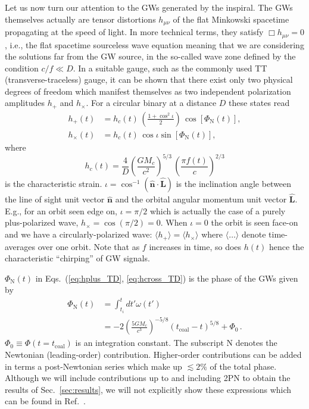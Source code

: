 \documentclass[amsmath,amssymb,aps,floats,amsfonts,notitlepage,superscriptaddress,eqsecnum,nofootinbib,10pt]{revtex4-1}
\newcommand{\nn}{\nonumber}
\newcommand{\f}{\frac}
\newcommand{\be}{\begin{equation}}
\newcommand{\ee}{\end{equation}}
\begin{document}
Let us now turn our attention to the GWs generated by the inspiral.
The GWs themselves actually are tensor distortions $h_{\mu\nu}$ of the flat Minkowski
spacetime propagating at the speed of light.
In more technical terms, they satisfy $\Box h_{\mu\nu} = 0$, i.e., the flat spacetime sourceless wave equation
meaning that we are considering the solutions far from the GW source, in the so-called wave zone defined by the condition $ c/f \ll D$.
In a suitable gauge, such as the commonly used TT (transverse-traceless) gauge, it can be shown that
there exist only two physical degrees of freedom which manifest themselves
as two independent polarization amplitudes $h_+$ and $h_\times$. %
For a circular binary at a distance $D$ these states read
%
\begin{align}
 h_+(t) &= h_c(t)\, \left(\f{1+\cos^2\iota}{2}\right)\, \cos[\Phi_\text{N}(t)],\label{eq:hplus_TD}\\
 h_\times(t) & =h_c(t)\,\cos\iota \sin[\Phi_\text{N}(t)]\label{eq:hcross_TD},
\end{align}
%
%
where
%
\be
h_c(t) =\f{4}{D}\left(\f{G M_c}{c^2}\right)^{5/3}\, \left(\f{\pi f(t)}{c}\right)^{2/3} \label{eq:h_c}
\ee
is the characteristic strain.
$\iota=\cos^{-1}(\mathbf{\hat{n}}\cdot{\mathbf{\hat{L}}}) $ is the inclination angle between the line of sight unit vector $\mathbf{\hat{n}} $ and the orbital angular momentum unit vector $\mathbf{\hat{L}}$. 
E.g., for an orbit seen edge on, $\iota = \pi/2$ which is actually the case of a purely plus-polarized wave, $h_\times=\cos(\pi/2)=0$.
When $\iota=0$ the orbit is seen face-on and we have a circularly-polarized wave: $\langle h_+ \rangle = \langle h_\times\rangle$ where $\langle \ldots \rangle$
denote time-averages over one orbit. Note that as $f$ increases in time, so does $h(t)$ hence the characteristic ``chirping'' of GW signals.

$\Phi_\text{N}(t)$ in Eqs.~(\ref{eq:hplus_TD}, \ref{eq:hcross_TD}) is the phase of the GWs given by
%
\begin{align}
\Phi_\text{N}(t) &=\int_{t_i}^t dt' \omega(t') \nn\\
&= -2\left(\f{5 G M_c}{c^3}\right)^{-5/8} (t_\text{coal}-t)^{5/8}+ \Phi_0 \, .\label{eq:Phase}
\end{align}
%
$\Phi_0 \equiv \Phi(t=t_\text{coal})$ is an integration constant. The subscript N denotes the Newtonian (leading-order) contribution. 
Higher-order contributions can be added in terms a post-Newtonian series which make up $\lesssim 2\%$ of the total phase.
Although we will include contributions up to and including 2PN to obtain the results of Sec.~\ref{sec:results}, we will not explicitly show these expressions 
which can be found in Ref.~\cite{Blanchet_LRR}.
\end{document}
